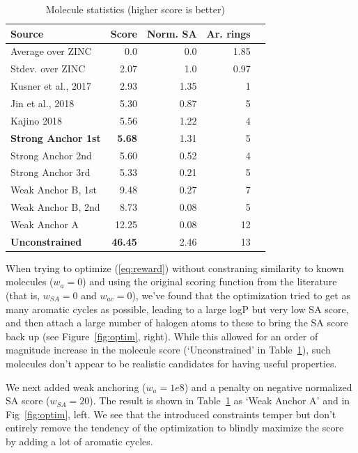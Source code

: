 \documentclass{article}
\begin{document}
\begin{table}[ht]
	\begin{center}
			\caption{Molecule statistics (higher score is better)}\label{tab:table1}
		\begin{tabular}{|l|r|r|r|r|} 
			\hline
			Source & Score & Norm. SA & Ar. rings\\
			\hline
			Average over ZINC&0.0& 0.0 &1.85\\
			Stdev. over ZINC&2.07&1.0&0.97\\\hline
			Kusner et al., 2017 & 2.93 &  1.35 & 1 \\
			Jin et al., 2018 & 5.30 & 0.87 & 5 \\
			Kajino 2018 & 5.56 & 1.22  & 4 \\\hline
			{\bf Strong Anchor 1st} &{\bf 5.68} &  1.31 & 5 \\
			Strong Anchor 2nd & 5.60 & 0.52 & 4 \\
			Strong Anchor 3rd & 5.33 &  0.21 & 5 \\\hline
			Weak Anchor B, 1st & 9.48  & 0.27 & 7 \\
			Weak Anchor B, 2nd & 8.73  & 0.08 & 5 \\
			Weak Anchor A & 12.25 &  0.08 & 12 \\
			{\bf Unconstrained}& {\bf 46.45} &2.46 & 13 \\
			\hline
		\end{tabular}
	
	\end{center}
\end{table}
When trying to optimize  (\ref{eq:reward}) without constraning similarity to known molecules ($w_{a} =0$) and using the original scoring function from the literature (that is, $w_{SA}=0$ and  $w_{ac}=0$), we've found that the optimization tried to get as many aromatic cycles as possible, leading to a large logP but very low SA score, and then attach a large number of halogen atoms to these to bring the SA score back up (see Figure~\ref{fig:optim}, right). While this allowed for an order of magnitude increase in the molecule score (`Unconstrained' in Table~\ref{tab:table1}), such molecules don't appear to be realistic candidates for having useful properties. 

We next added weak anchoring ($w_{a} =1e8$) and a penalty on negative normalized SA score ($w_{SA}=20$). The result is shown in Table~\ref{tab:table1} as `Weak Anchor A' and in Fig~\ref{fig:optim}, left. We see that the introduced constraints temper but don't entirely remove the tendency of the optimization to blindly maximize the score by adding a lot of aromatic cycles.
\end{document}
